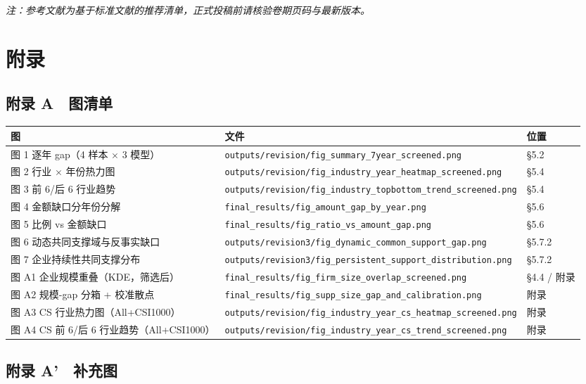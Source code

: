 \documentclass[11pt,a4paper]{ctexart}
\begin{document}
\emph{注：参考文献为基于标准文献的推荐清单，正式投稿前请核验卷期页码与最新版本。}

\section{附录}

\subsection{附录 A　图清单}

\begin{center}
\centering
\small
\begin{tabular}{lll}
\toprule
图 & 文件 & 位置 \\
\midrule
图 1 逐年 gap（4 样本 $\times$ 3 模型） & \texttt{outputs/revision/fig\_summary\_7year\_screened.png} & \S5.2 \\
图 2 行业 $\times$ 年份热力图 & \texttt{outputs/revision/fig\_industry\_year\_heatmap\_screened.png} & \S5.4 \\
图 3 前 6/后 6 行业趋势 & \texttt{outputs/revision/fig\_industry\_topbottom\_trend\_screened.png} & \S5.4 \\
图 4 金额缺口分年份分解 & \texttt{final\_results/fig\_amount\_gap\_by\_year.png} & \S5.6 \\
图 5 比例 vs 金额缺口 & \texttt{final\_results/fig\_ratio\_vs\_amount\_gap.png} & \S5.6 \\
图 6 动态共同支撑域与反事实缺口 & \texttt{outputs/revision3/fig\_dynamic\_common\_support\_gap.png} & \S5.7.2 \\
图 7 企业持续性共同支撑分布 & \texttt{outputs/revision3/fig\_persistent\_support\_distribution.png} & \S5.7.2 \\
图 A1 企业规模重叠（KDE，筛选后） & \texttt{final\_results/fig\_firm\_size\_overlap\_screened.png} & \S4.4 / 附录 \\
图 A2 规模-gap 分箱 + 校准散点 & \texttt{final\_results/fig\_supp\_size\_gap\_and\_calibration.png} & 附录 \\
图 A3 CS 行业热力图（All+CSI1000） & \texttt{outputs/revision/fig\_industry\_year\_cs\_heatmap\_screened.png} & 附录 \\
图 A4 CS 前 6/后 6 行业趋势（All+CSI1000） & \texttt{outputs/revision/fig\_industry\_year\_cs\_trend\_screened.png} & 附录 \\
\bottomrule
\end{tabular}
\end{center}

\subsection{附录 A'　补充图}
\end{document}

